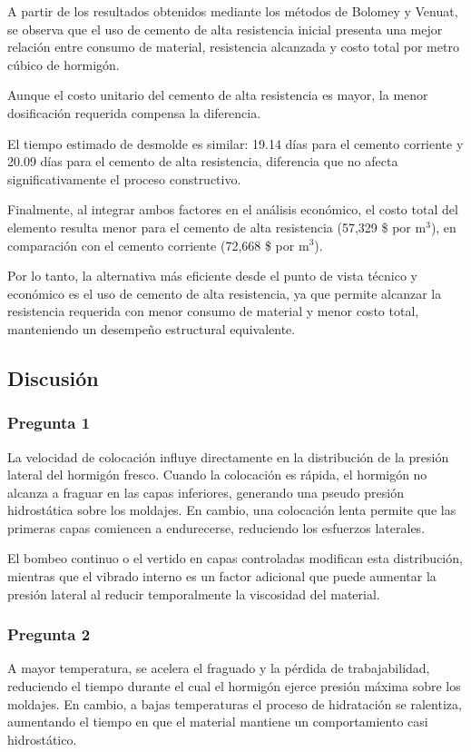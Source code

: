 A partir de los resultados obtenidos mediante los métodos de Bolomey y Venuat, se observa que el uso de cemento de alta resistencia inicial presenta una mejor relación entre consumo de material, resistencia alcanzada y costo total por metro cúbico de hormigón.

Aunque el costo unitario del cemento de alta resistencia es mayor, la menor dosificación requerida compensa la diferencia.  

El tiempo estimado de desmolde es similar: 19.14 días para el cemento corriente y 20.09 días para el cemento de alta resistencia, diferencia que no afecta significativamente el proceso constructivo.

Finalmente, al integrar ambos factores en el análisis económico, el costo total del elemento resulta menor para el cemento de alta resistencia (57,329 \$ por m$^3$), en comparación con el cemento corriente (72,668 \$ por m$^3$).  

Por lo tanto, la alternativa más eficiente desde el punto de vista técnico y económico es el uso de cemento de alta resistencia, ya que permite alcanzar la resistencia requerida con menor consumo de material y menor costo total, manteniendo un desempeño estructural equivalente.

\newpage
\subsection*{Discusión}

\subsubsection*{Pregunta 1} 
La velocidad de colocación influye directamente en la distribución de la presión lateral del hormigón fresco.  
Cuando la colocación es rápida, el hormigón no alcanza a fraguar en las capas inferiores, generando una pseudo presión hidrostática sobre los moldajes. En cambio, una colocación lenta permite que las primeras capas comiencen a endurecerse, reduciendo los esfuerzos laterales.  

El bombeo continuo o el vertido en capas controladas modifican esta distribución, mientras que el vibrado interno es un factor adicional que puede aumentar la presión lateral al reducir temporalmente la viscosidad del material.


\subsubsection*{Pregunta 2} 
A mayor temperatura, se acelera el fraguado y la pérdida de trabajabilidad, reduciendo el tiempo durante el cual el hormigón ejerce presión máxima sobre los moldajes. En cambio, a bajas temperaturas el proceso de hidratación se ralentiza, aumentando el tiempo en que el material mantiene un comportamiento casi hidrostático.  

